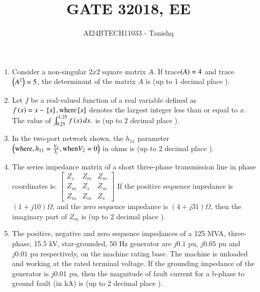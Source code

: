 \documentclass[journal]{IEEEtran}
\begin{document}

\vspace{3cm}
\author{AI24BTECH11033 - Tanishq}
\title{GATE 3}
{\let\newpage\relax\maketitle}
\title{2018, EE}
\renewcommand{\thefigure}{\theenumi}
\renewcommand{\thetable}{\theenumi}
\setlength{\intextsep}{10pt} %
\renewcommand{\thetable}{\theenumi}
\begin{enumerate}
\item Consider a non-singular $2x2$ square matrix $A$. If trace$\left(A\right) = 4$ and trace$\left(A^2\right) = 5$, the determinant of the matrix $A$ is \underline{\hspace{1cm}} (up to 1 decimal place ).
\item Let $f$ be a real-valued function of a real variable defined as $f\left(x\right) = x - {}\left[x\right], \text{where} {}\left[x\right]$ denotes the largest integer less than or equal to $x$. The value of $\int_{0.25}^{1.25} f\left(x\right) dx.$ is \underline{\hspace{1cm}} (up to 2 decimal place ).
\item In the two-port network shown, the $h_{11}$ parameter $\left(\text{where}, h_{11} = \frac{V_1}{I_1}, \text{when} V_2 = 0\right)$ in ohms is \underline{\hspace{1cm}} (up to 2 decimal place ).
\begin{figure}[!ht]
    \centering
    \label{fig:power system network}
    \end{figure}
\item The series impedance matrix of a short three-phase transmission line in phase coordinates is:
$\begin{bmatrix}
Z_s & Z_m & Z_m \\
Z_m & Z_s & Z_m \\
Z_m & Z_m & Z_s
\end{bmatrix}$
If the positive sequence impedance is $(1 + j10) \Omega$, and the zero sequence impedance is $(4 + j31) \Omega$, then the imaginary part of $Z_m$ is \underline{\hspace{1cm}} (up to 2 decimal place ).
\item The positive, negative and zero sequence impedances of a 125 MVA, three-phase, 15.5 kV, star-grounded, 50 Hz generator are $j0.1$ pu, $j0.05$ pu and $j0.01$ pu respectively, on the machine rating base. The machine is unloaded and working at the rated terminal voltage. If the grounding impedance of the generator is $j0.01$ pu, then the magnitude of fault current for a b-phase to ground fault (in kA) is \underline{\hspace{1cm}} (up to 2 decimal place ). 

\end{enumerate}
\end{document}
